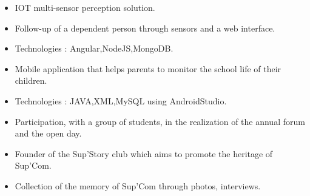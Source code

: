 \documentclass[9pt,a4paper,ragged2e,normalphoto]{altacv}
\begin{document}
\divider

\begin{itemize}
\item IOT multi-sensor perception solution.
\item Follow-up of a dependent person through sensors and a web interface.  
\item Technologies : Angular,NodeJS,MongoDB.
\end{itemize}

\divider

\begin{itemize}
\item Mobile application that helps parents to monitor the school life of their children.    
\item Technologies : JAVA,XML,MySQL using AndroidStudio.
\end{itemize}




{}

{}


\begin{itemize}
\item Participation, with a group of students, in the realization of the annual forum and the open day.
\end{itemize}

\divider

\begin{itemize}
\item Founder of the Sup'Story club which aims to promote the heritage of Sup'Com.
\item Collection of the memory of Sup'Com through photos, interviews.
\end{itemize}


\clearpage
\end{document}

